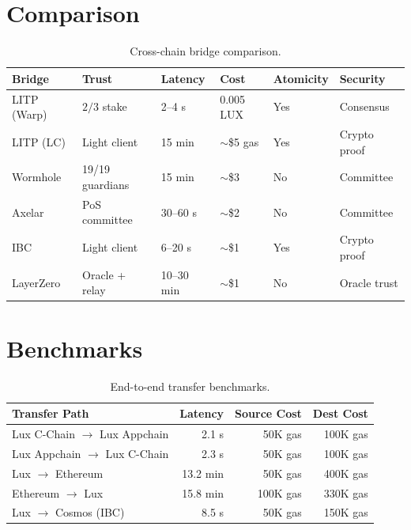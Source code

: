 \documentclass[11pt,a4paper]{article}
\begin{document}
\section{Comparison}\label{sec:comparison}

\begin{table}[H]
\centering
\caption{Cross-chain bridge comparison.}
\label{tab:comparison}
\begin{tabular}{p{2.2cm}p{2cm}p{2cm}p{2cm}p{2cm}p{2cm}}
\toprule
\textbf{Bridge} & \textbf{Trust} & \textbf{Latency} & \textbf{Cost} & \textbf{Atomicity} & \textbf{Security} \\
\midrule
LITP (Warp) & $2/3$ stake & 2--4 s & 0.005 LUX & Yes & Consensus \\
LITP (LC) & Light client & 15 min & $\sim$\$5 gas & Yes & Crypto proof \\
Wormhole & 19/19 guardians & 15 min & $\sim$\$3 & No & Committee \\
Axelar & PoS committee & 30--60 s & $\sim$\$2 & No & Committee \\
IBC & Light client & 6--20 s & $\sim$\$1 & Yes & Crypto proof \\
LayerZero & Oracle + relay & 10--30 min & $\sim$\$1 & No & Oracle trust \\
\bottomrule
\end{tabular}
\end{table}

\section{Benchmarks}\label{sec:benchmarks}

\begin{table}[H]
\centering
\caption{End-to-end transfer benchmarks.}
\label{tab:benchmarks}
\begin{tabular}{lrrr}
\toprule
\textbf{Transfer Path} & \textbf{Latency} & \textbf{Source Cost} & \textbf{Dest Cost} \\
\midrule
Lux C-Chain $\to$ Lux Appchain & 2.1 s & 50K gas & 100K gas \\
Lux Appchain $\to$ Lux C-Chain & 2.3 s & 50K gas & 100K gas \\
Lux $\to$ Ethereum & 13.2 min & 50K gas & 400K gas \\
Ethereum $\to$ Lux & 15.8 min & 100K gas & 330K gas \\
Lux $\to$ Cosmos (IBC) & 8.5 s & 50K gas & 150K gas \\
\bottomrule
\end{tabular}
\end{table}
\end{document}
